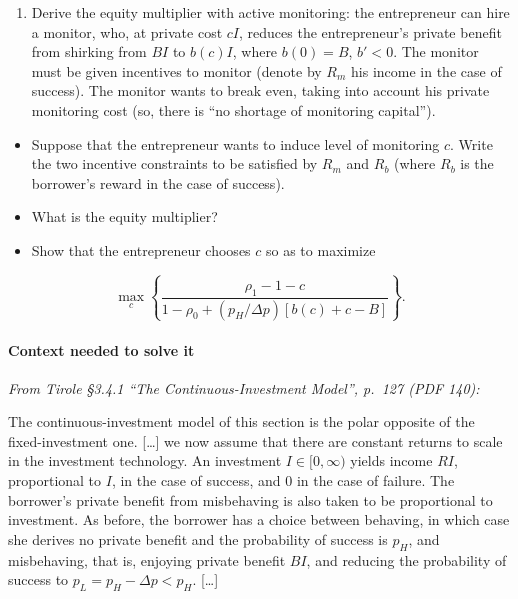 \documentclass[11pt,a4paper]{article}
\providecommand{\tightlist}{\setlength{\itemsep}{0pt}\setlength{\parskip}{0pt}}
\begin{document}
\begin{enumerate}
\def\labelenumi{(\roman{enumi})}
\setcounter{enumi}{1}
\tightlist
\item
  Derive the equity multiplier with active monitoring: the entrepreneur can hire a monitor, who, at
  private cost \(cI\), reduces the entrepreneur's private benefit from shirking from \(BI\) to
  \(b(c)I\), where \(b(0) = B\), \(b' < 0\). The monitor must be given incentives to monitor (denote
  by \(R_m\) his income in the case of success). The monitor wants to break even, taking into
  account his private monitoring cost (so, there is ``no shortage of monitoring capital'').
\end{enumerate}

\begin{itemize}
\tightlist
\item
  Suppose that the entrepreneur wants to induce level of monitoring \(c\). Write the two incentive
  constraints to be satisfied by \(R_m\) and \(R_b\) (where \(R_b\) is the borrower's reward in the
  case of success).
\item
  What is the equity multiplier?
\item
  Show that the entrepreneur chooses \(c\) so as to maximize
\end{itemize}

\[\max_c \left\{ \frac{\rho_1 - 1 - c}{1 - \rho_0 + (p_H/\Delta p)[b(c) + c - B]} \right\}.\]

\paragraph{Context needed to solve it}

\emph{From Tirole §3.4.1 ``The Continuous-Investment Model'', p.~127 (PDF 140):}

The continuous-investment model of this section is the polar opposite of the fixed-investment one.
{[}\ldots{]} we now assume that there are constant returns to scale in the investment technology. An
investment \(I \in [0, \infty)\) yields income \(RI\), proportional to \(I\), in the case of
success, and 0 in the case of failure. The borrower's private benefit from misbehaving is also taken
to be proportional to investment. As before, the borrower has a choice between behaving, in which
case she derives no private benefit and the probability of success is \(p_H\), and misbehaving, that
is, enjoying private benefit \(BI\), and reducing the probability of success to
\(p_L = p_H - \Delta p < p_H\). {[}\ldots{]}
\end{document}
